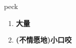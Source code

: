 
\begin{frame}
{\huge peck}
\begin{center}
\begin{enumerate}\Large
  \item \textbf{大量}
  \item \textbf{(不情愿地)小口咬}
\end{enumerate}
\end{center}
\end{frame}
